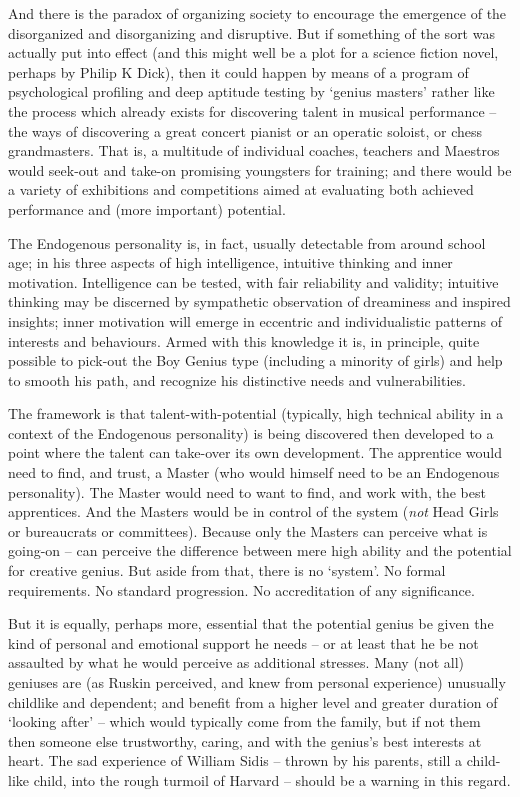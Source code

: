 \documentclass[
]{book}
\begin{document}
And there is the paradox of organizing society to encourage the emergence of the disorganized and disorganizing and disruptive. But if something of the sort was actually put into effect (and this might well be a plot for a science fiction novel, perhaps by Philip K Dick), then it could happen by means of a program of psychological profiling and deep aptitude testing by `genius masters' rather like the process which already exists for discovering talent in musical performance -- the ways of discovering a great concert pianist or an operatic soloist, or chess grandmasters. That is, a multitude of individual coaches, teachers and Maestros would seek-out and take-on promising youngsters for training; and there would be a variety of exhibitions and competitions aimed at evaluating both achieved performance and (more important) potential.

The Endogenous personality is, in fact, usually detectable from around school age; in his three aspects of high intelligence, intuitive thinking and inner motivation. Intelligence can be tested, with fair reliability and validity; intuitive thinking may be discerned by sympathetic observation of dreaminess and inspired insights; inner motivation will emerge in eccentric and individualistic patterns of interests and behaviours. Armed with this knowledge it is, in principle, quite possible to pick-out the Boy Genius type (including a minority of girls) and help to smooth his path, and recognize his distinctive needs and vulnerabilities.

The framework is that talent-with-potential (typically, high technical ability in a context of the Endogenous personality) is being discovered then developed to a point where the talent can take-over its own development. The apprentice would need to find, and trust, a Master (who would himself need to be an Endogenous personality). The Master would need to want to find, and work with, the best apprentices. And the Masters would be in control of the system (\emph{not} Head Girls or bureaucrats or committees). Because only the Masters can perceive what is going-on -- can perceive the difference between mere high ability and the potential for creative genius. But aside from that, there is no `system'. No formal requirements. No standard progression. No accreditation of any significance.

But it is equally, perhaps more, essential that the potential genius be given the kind of personal and emotional support he needs -- or at least that he be not assaulted by what he would perceive as additional stresses. Many (not all) geniuses are (as Ruskin perceived, and knew from personal experience) unusually childlike and dependent; and benefit from a higher level and greater duration of `looking after' -- which would typically come from the family, but if not them then someone else trustworthy, caring, and with the genius's best interests at heart. The sad experience of William Sidis -- thrown by his parents, still a child-like child, into the rough turmoil of Harvard -- should be a warning in this regard.
\end{document}

